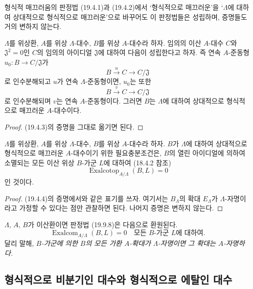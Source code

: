\begin{env}[19.9.6]
\label{0.19.9.6-ko}
형식적 매끄러움의 판정법 (19.4.1)과 (19.4.2)에서 ‘형식적으로
매끄러운’을 ‘$\Lambda$에 대하여 상대적으로 형식적으로 매끄러운’으로
바꾸어도 이 판정법들은 성립하며, 증명들도 거의 변하지 않는다.
\end{env}

\begin{proposition}[19.9.7]
\label{0.19.9.7-ko}
$\Lambda$를 위상환, $A$를 위상 $\Lambda$-대수, $B$를 위상
$A$-대수라 하자. 임의의 이산 $A$-대수 $C$와 $\mathfrak J^2=0$인
$C$의 임의의 아이디얼 $\mathfrak J$에 대하여 다음이 성립한다고 하자.
즉 연속 $A$-준동형 $u_0:B\to C/\mathfrak J$가
\[
  B\xrightarrow{u}C\longrightarrow C/\mathfrak J
\]
로 인수분해되고 $u$가 연속 $\Lambda$-준동형이면, $u_0$는 또한
\[
  B\xrightarrow{v}C\longrightarrow C/\mathfrak J
\]
로 인수분해되며 $v$는 연속 $A$-준동형이다. 그러면 $B$는
$\Lambda$에 대하여 상대적으로 형식적으로 매끄러운 $A$-대수이다.
\end{proposition}

\begin{proof}
(19.4.3)의 증명을 그대로 옮기면 된다.
\end{proof}

\begin{proposition}[19.9.8]
\label{0.19.9.8-ko}
$\Lambda$를 위상환, $A$를 위상 $\Lambda$-대수, $B$를 위상
$A$-대수라 하자. $B$가 $\Lambda$에 대하여 상대적으로 형식적으로
매끄러운 $A$-대수이기 위한 필요충분조건은, $B$의 열린 아이디얼에
의하여 소멸되는 모든 이산 위상 $B$-가군 $L$에 대하여
(18.4.2 참조)
\[
  \operatorname{Exalcotop}_{A/\Lambda}(B,L)=0
\]
인 것이다.
\end{proposition}

\begin{proof}
(19.4.4)의 증명에서와 같은 표기를 쓰자. 여기서는 $B_\Lambda$의 확대
$E_\Lambda$가 $\Lambda$-자명이라고 가정할 수 있다는 점만 관찰하면
된다. 나머지 증명은 변하지 않는다.
\end{proof}

$\Lambda$, $A$, $B$가 이산환이면 판정법 (19.9.8)은 다음으로
환원된다.
\begin{equation}
\tag{19.9.8.1}
\label{0.19.9.8.1-ko}
  \operatorname{Exalcom}_{A/\Lambda}(B,L)=0
  \quad\text{모든 $B$-가군 $L$에 대하여}.
\end{equation}
달리 말해, \emph{$B$-가군에 의한 $B$의 모든 가환 $A$-확대가
$\Lambda$-자명이면 그 확대는 $A$-자명하다.}

\subsection{형식적으로 비분기인 대수와 형식적으로 에탈인 대수}
\label{subsection:0.19.10-ko}
\label{0.19.10-ko}

